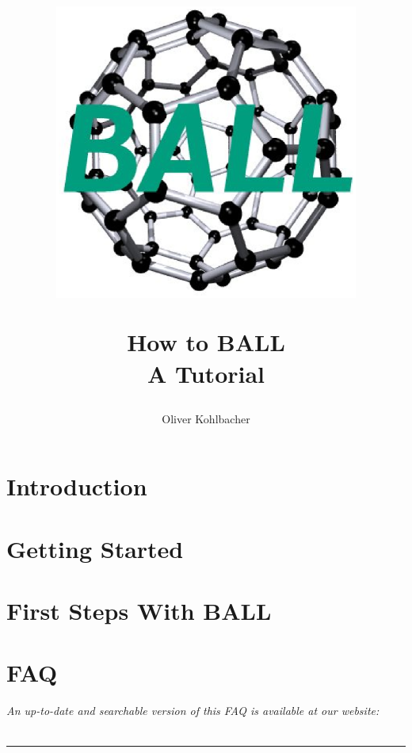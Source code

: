 \documentclass[12pt,twoside]{report}
\author{Oliver Kohlbacher}
\title{
	\begin{center}
		\includegraphics[width=10cm]{logo.eps}
	\end{center}
	\Huge How to BALL\\ 
	\Large A Tutorial
}
\begin{document}
\maketitle

\setcounter{page}{1}
\tableofcontents
{}
\setcounter{page}{1}

\chapter{Introduction}
\label{chapter:introduction}


\chapter{Getting Started}
\label{chapter:getting-started}




\chapter{First Steps With BALL}
\label{chapter:first-steps}




\chapter{FAQ}
\label{chapter:faq}
\newpage
\noindent
{\it An up-to-date and searchable version of this FAQ is available at our
website:\\
}\\
\hspace{1mm}
\rule{\textwidth}{0.1pt}
\hspace{3mm}



\newpage
{}
\printindex

\end{document}
